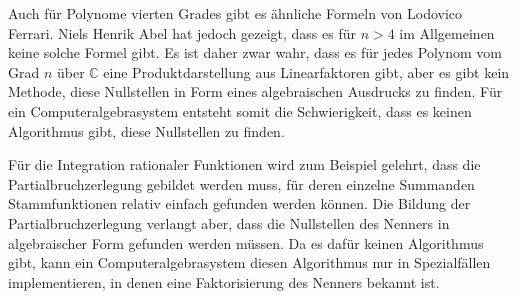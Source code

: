 Auch für Polynome vierten Grades gibt es ähnliche Formeln 
%
von Lodovico Ferrari.
%
Niels Henrik Abel hat jedoch gezeigt, dass es für $n>4$ im
%
Allgemeinen keine solche Formel gibt.
Es ist daher zwar wahr, dass es für jedes Polynom vom Grad $n$
über $\mathbb{C}$ eine Produktdarstellung aus Linearfaktoren
gibt, aber es gibt kein Methode, diese Nullstellen in Form eines
algebraischen Ausdrucks zu finden.
Für ein Computeralgebrasystem entsteht somit die Schwierigkeit,
dass es keinen Algorithmus gibt, diese Nullstellen zu finden.

Für die Integration rationaler Funktionen wird zum Beispiel gelehrt,
dass die Partialbruchzerlegung gebildet werden muss, für deren einzelne
%
Summanden Stammfunktionen relativ einfach gefunden werden können.
Die Bildung der Partialbruchzerlegung verlangt aber, dass die
Nullstellen des Nenners in algebraischer Form gefunden werden
müssen.
Da es dafür keinen Algorithmus gibt, kann ein Computeralgebrasystem
diesen Algorithmus nur in Spezialfällen implementieren, in denen
eine Faktorisierung des Nenners bekannt ist.


